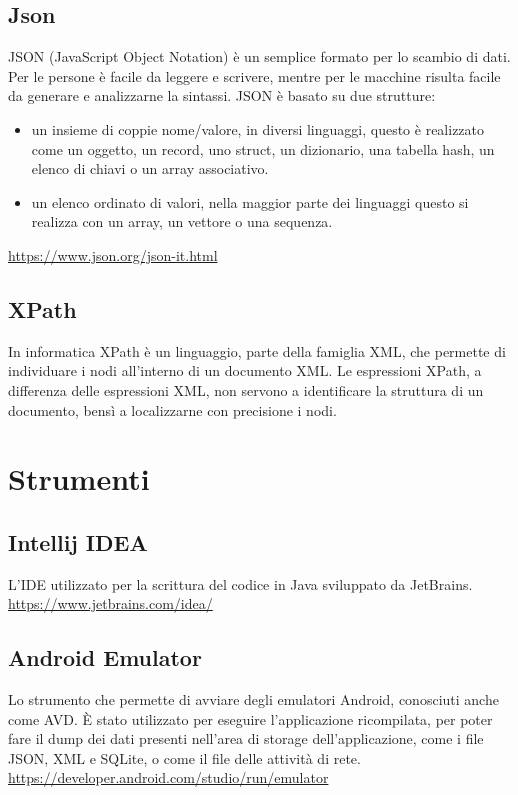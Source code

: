 \subsection*{Json}
JSON (JavaScript Object Notation) è un semplice formato per lo scambio di dati.
Per le persone è facile da leggere e scrivere, mentre per le macchine risulta facile da generare e analizzarne la sintassi.
JSON è basato su due strutture:
\begin{itemize}
    \item un insieme di coppie nome/valore, in diversi linguaggi, questo è realizzato come un oggetto, un record, uno struct, un dizionario, una tabella hash, un elenco di chiavi o un array associativo.
    \item un elenco ordinato di valori, nella maggior parte dei linguaggi questo si realizza con un array, un vettore o una sequenza.
\end{itemize}
\url{https://www.json.org/json-it.html}

\subsection*{XPath}\label{subsec:xpath}
In informatica XPath è un linguaggio, parte della famiglia XML, che permette di individuare i nodi all'interno di un documento XML. Le espressioni XPath, a differenza delle espressioni XML, non servono a identificare la struttura di un documento, bensì a localizzarne con precisione i nodi.


\section{Strumenti}\label{sec:strumenti}

\subsection*{Intellij IDEA}
L'IDE utilizzato per la scrittura del codice in Java sviluppato da JetBrains.
\url{https://www.jetbrains.com/idea/}

\subsection*{Android Emulator}
Lo strumento che permette di avviare degli emulatori Android, conosciuti anche come AVD. È stato utilizzato per eseguire l'applicazione ricompilata, per poter fare il dump dei dati presenti nell'area di storage dell'applicazione, come i file JSON, XML e SQLite, o come il file delle attività di rete.
\url{https://developer.android.com/studio/run/emulator}

